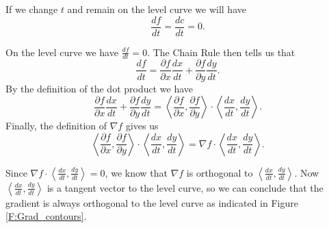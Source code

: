 \begin{activitySolution}
\ba 
\item If we change $t$ and remain on the level curve we will have
\[\frac{df}{dt} = \frac{dc}{dt} = 0.\]

\item On the level curve we have $\frac{df}{dt} = 0$. The Chain Rule then tells us that
\[\frac{df}{dt} = \frac{\partial f}{\partial x} \frac{dx}{dt} + \frac{\partial f}{\partial y} \frac{dy}{dt}.\]
By the definition of the dot product we have
\[\frac{\partial f}{\partial x} \frac{dx}{dt} + \frac{\partial f}{\partial y} \frac{dy}{dt} = \left\langle \frac{\partial f}{\partial x}, \frac{\partial f}{\partial y} \right\rangle \cdot  \left\langle \frac{dx}{dt}, \frac{dy}{dt} \right\rangle.\]
Finally, the definition of $\nabla f$ gives us
\[\left\langle \frac{\partial f}{\partial x}, \frac{\partial f}{\partial y} \right\rangle \cdot  \left\langle \frac{dx}{dt}, \frac{dy}{dt} \right\rangle = \nabla f \cdot \left\langle \frac{dx}{dt}, \frac{dy}{dt} \right\rangle.\]

\item Since $\nabla f \cdot \left\langle \frac{dx}{dt}, \frac{dy}{dt} \right\rangle = 0$, we know that $\nabla f$ is orthogonal to $\left\langle \frac{dx}{dt}, \frac{dy}{dt} \right\rangle$. Now $\left\langle \frac{dx}{dt}, \frac{dy}{dt} \right\rangle$ is a tangent vector to the level curve, so we can conclude that the gradient is always orthogonal to the level curve as indicated in Figure \ref{F:Grad_contours}.

\ea


\end{activitySolution}
\aftera
